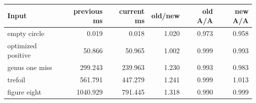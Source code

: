 \begin{center}
\small
\begin{tabular}{lrrrrr}
\toprule
Input & previous ms & current ms & old/new & old A/A & new A/A\\
\midrule
empty circle & 0.019 & 0.018 & 1.020 & 0.973 & 0.958\\
optimized positive & 50.866 & 50.965 & 1.002 & 0.999 & 0.993\\
genus one miss & 299.243 & 239.963 & 1.230 & 0.993 & 0.983\\
trefoil & 561.791 & 447.279 & 1.241 & 0.999 & 1.013\\
figure eight & 1040.929 & 791.445 & 1.318 & 0.990 & 0.999\\
\bottomrule
\end{tabular}
\end{center}
